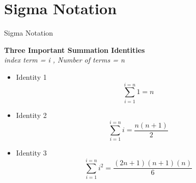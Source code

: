 \documentclass{beamer}
\begin{document}

\section{Sigma Notation}

\begin{frame}{Sigma Notation}

\textbf{Three Important Summation Identities}\\
\textit{index term = i , Number of terms = n }

\begin{itemize}
\item Identity 1
\[ \sum^{i=n}_{i=1} 1 = n \]
\item Identity 2  
\[ \sum^{i=n}_{i=1} i = \frac{n(n+1)}{2} \]
\item Identity 3 
\[ \sum^{i=n}_{i=1} i^2 = \frac{(2n+1)(n+1)(n)}{6} \]
\end{itemize}


\end{frame}
\end{document}

